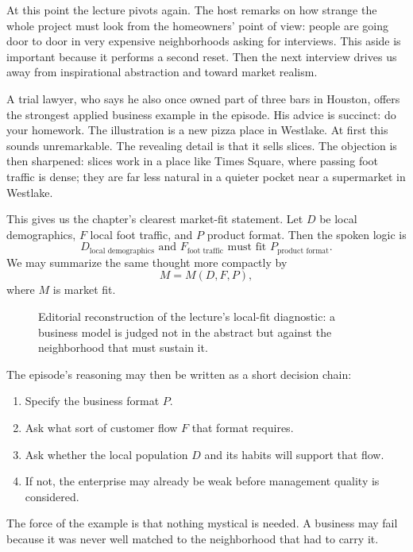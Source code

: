 At this point the lecture pivots again. The host remarks on how strange the whole project must look from the homeowners' point of view: people are going door to door in very expensive neighborhoods asking for interviews. This aside is important because it performs a second reset. Then the next interview drives us away from inspirational abstraction and toward market realism.

A trial lawyer, who says he also once owned part of three bars in Houston, offers the strongest applied business example in the episode. His advice is succinct: do your homework. The illustration is a new pizza place in Westlake. At first this sounds unremarkable. The revealing detail is that it sells slices. The objection is then sharpened: slices work in a place like Times Square, where passing foot traffic is dense; they are far less natural in a quieter pocket near a supermarket in Westlake.

This gives us the chapter's clearest market-fit statement. Let \(D\) be local demographics, \(F\) local foot traffic, and \(P\) product format. Then the spoken logic is
\begin{equation}
D_{\text{local demographics}} \text{ and } F_{\text{foot traffic}} \text{ must fit } P_{\text{product format}}.
\end{equation}
We may summarize the same thought more compactly by
\begin{equation}
M = M(D,F,P),
\end{equation}
where \(M\) is market fit.

\begin{figure}[h]
\centering
{}
\caption{Editorial reconstruction of the lecture's local-fit diagnostic: a business model is judged not in the abstract but against the neighborhood that must sustain it.}
\end{figure}

The episode's reasoning may then be written as a short decision chain:
\begin{enumerate}
\item Specify the business format \(P\).
\item Ask what sort of customer flow \(F\) that format requires.
\item Ask whether the local population \(D\) and its habits will support that flow.
\item If not, the enterprise may already be weak before management quality is considered.
\end{enumerate}
The force of the example is that nothing mystical is needed. A business may fail because it was never well matched to the neighborhood that had to carry it.

